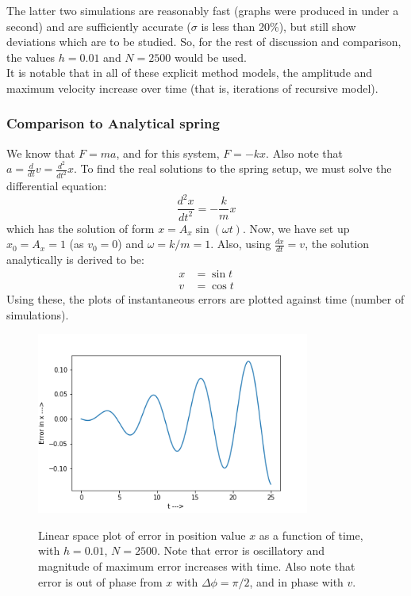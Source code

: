 \documentclass{report}
\begin{document}
The latter two simulations are reasonably fast (graphs were produced in under a second) and are sufficiently accurate ($\sigma$ is less than 20\%), but still show deviations which are to be studied. So, for the rest of discussion and comparison, the values $h=0.01$ and $N=2500$ would be used.\\
It is notable that in all of these explicit method models, the amplitude and maximum velocity increase over time (that is, iterations of recursive model).
\subsubsection*{Comparison to Analytical spring}
We know that $F=ma$, and for this system, $F=-kx$. Also note that $a= \frac{d}{dt}v=\frac{d^2}{dt^2}x$. To find the real solutions to the spring setup, we must solve the differential equation:
$$\frac{d^2x}{dt^2}=-\frac{k}{m}x$$
which has the solution of form $x = A_x \sin(\omega t)$. Now, we have set up $x_0= A_x=1$ (as $v_0=0$) and $\omega = k/m = 1$. Also, using $\frac{dx}{dt}=v$, the solution analytically is derived to be:
\begin{align*}
	x &= \sin t\\
    v &= \cos t
\end{align*}
Using these, the plots of instantaneous errors are plotted against time (number of simulations).
\begin{figure}[H]
	\centering
	\includegraphics[width = 0.8\textwidth]{eXe.png}
	\label{errorinXe}
	\caption{Linear space plot of error in position value $x$ as a function of time, with $h=0.01$, $N=2500$. Note that error is oscillatory and magnitude of maximum error increases with time. Also note that error is out of phase from $x$ with $\Delta\phi =\pi/2$, and in phase with $v$. }
\end{figure}
\end{document}

